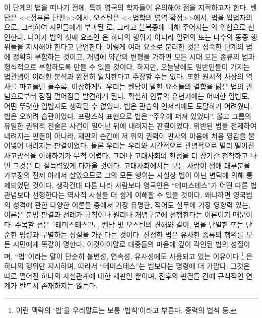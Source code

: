 이 단계의 법을 떠나기 전에,
특히 영국의 학자들이 유의해야 점을 지적하고자 한다.
벤담은 <<정부론 단편>>에서,
오스틴은 <<법학의 영역 확정>>에서,
법을 입법자의 으로,
그리하여 시민들에게 부과된 로,
그리고 불복종에 대해 주어지는 의 위협으로 선언한다.
나아가 법의 첫째 요소인 은 하나의 행위가 아니라
일련의 또는 다수의 동종 행위들을 지시해야 한다고 단언한다.
이렇게 여러 요소로 분리한 것은 성숙한 단계의 법에 정확히 부합하는 것이고,
개념에 약간의 변형을 가하면 모든 시대 모든 종류의 법과
형식적으로 부합하도록 만들 수 있을 것이다.
하지만, 오늘날에도 일반인들이 가지는 법관념이
이러한 분석과 완전히 일치한다고 주장할 수는 없다.
또한 원시적 사상의 역사를 파고들면 들수록, 이상하게도 우리는
벤담이 말한 요소들의 결합을 닮은 법의 관념으로부터 점점 멀어짐을 발견하게 된다.
확실히 인류의 유년기에는 어떠한 입법도, 어떤 뚜렷한 입법자도 생각될 수 없었다.
법은 관습의 언저리에도 도달하기 어려웠다.
법은 오히려 습관이었다.
프랑스식 표현으로 법은 ``주위에 퍼져 있었다''.
옳고 그름의 유일한 권위적 진술은 사건이 일어난 뒤에 내려지는 판결이었다.
위반된 법을 전제하여 내려지는 판결이 아니라,
재판의 순간에 저 위의 권력이 판사의 마음에
처음 영감을 불어넣어 내려지는 판결이었다.
물론 우리는 우리와 시간적으로 관념적으로 멀리 떨어진 사고방식을
이해하기가 무척 어렵다.
그러나 고대사회의 헌정을 더 장기간 천착하고 나면 그것은 더 설득력있게
다가올 것이다.
고대사회에서는 모든 사람이
생애 대부분을 가부장의 전제 아래서 살았으므로
그의 모든 행위는 사실상 법이 아닌 변덕에 의해 통제되었던 것이다.
생각건대 다른 나라 사람보다 영국인은
``테미스테스''가
어떤 다른 법 관념보다
선행한다는 역사적 사실을 더 쉽게 이해할 수 있을 것이다.
왜냐하면 영국법의 성격에 관한 다양한 이론들 중에서
가장 유명한, 적어도 실무에 가장 영향력 있는, 이론은 분명
판결과 선례가 규칙이나 원리나 개념구분에 선행한다는 이론이기 때문이다.
주목할 점은 ``테미스테스''도,
벤담 및 오스틴의 견해와 같이,
법을 단일한 또는 단순한 명령과 구별하는 성질을 가진다는 것이다.
진정한 법은 유사한 종류의 행위를 모든 시민에게 똑같이 명한다.
이것이야말로 대중들의 마음에 깊이 각인된 법의 성질이며,
``법''이라는 말이 단순히 불변성, 연속성, 유사성에도 사용되고 있는
이유이다.\footnote{이런 맥락의 `법'을 우리말로는 보통 `법칙'이라고 부른다.
  중력의 법칙 등.}
은 하나의 행위만 지시하며,
따라서 ``테미스테스''는 법보다는 명령에 더 가깝다.
그것은 따로 떨어진 하나의 사실관계에 대한 재판일 뿐이며,
전후의 판결들 간에 규칙적인 연계가 반드시 존재하지는 않는다.

